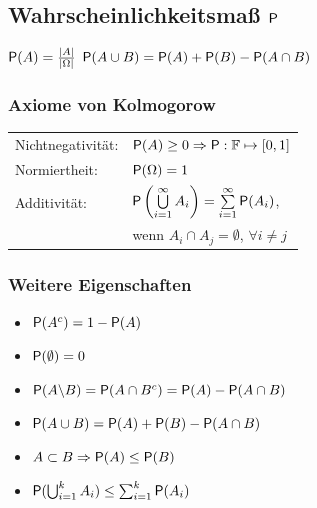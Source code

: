 \documentclass[german,color,6pt]{latex4ei/latex4ei_sheet}
\begin{document}
\begin{sectionbox}
	\subsection{Wahrscheinlichkeitsmaß $\P$}
	$\P(A) = \frac{|A|}{|\Omega|}$ \hfill $\P(A \cup B) = \P(A) + \P(B) - \P(A \cap B)$\\
	\subsubsection{Axiome von Kolmogorow}
	\begin{tabular}{ll}
		Nichtnegativität: & $\P(A) \geq 0 \Ra \P:\mathbb F \mapsto [0,1]$ \\
		Normiertheit: & $\P(\Omega) = 1$ \\
		Additivität: & $\P\left(\bigcup\limits_{i=1}^{\infty} A_i \right) = \sum\limits_{i=1}^{\infty} \P(A_i)$, \\
		& wenn $A_i \cap A_j = \emptyset$, $\forall i \neq j$ \\
	\end{tabular}
	\subsubsection{Weitere Eigenschaften}
	\begin{itemize}	
		\item 	$\P(A^c) = 1 - \P(A)$
		\item 	$\P(\emptyset) = 0$
		\item 	$\P(A \backslash B) = \P(A \cap B^c) = \P(A) - \P(A \cap B)$
		\item 	$\P(A \cup B) = \P(A) + \P (B) - \P(A \cap B)$
		\item 	$A \subset B \Rightarrow \P(A) \leq \P(B)$
		\item 	$\P(\bigcup_{i=1}^k A_i) \leq \sum_{i=1}^k \P(A_i)$
	\end{itemize}
	

\end{sectionbox}

\end{document}
